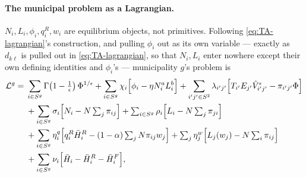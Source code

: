 \documentclass[12pt, a4paper]{article}
\theoremstyle{definition}
\theoremstyle{remark}
\begin{document}
\paragraph{The municipal problem as a Lagrangian.} $N_i,L_i,\phi_i,q_i^R,w_i$ are equilibrium objects, not primitives. Following \eqref{eq:TA-lagrangian}'s construction, and pulling $\phi_i$ out as its own variable — exactly as $d_{k\ell}$ is pulled out in \eqref{eq:TA-lagrangian}, so that $N_i,L_i$ enter nowhere except their own defining identities and $\phi_i$'s — municipality $g$'s problem is
\begin{align}
    \label{eq:muni-lagrangian}
\mathcal L^g = {}& \sum_{i\in S^g} \Gamma\!\left(1-\tfrac1\epsilon\right)\Phi^{1/\epsilon}
+ \sum_{i\in S^g}\chi_i\Bigl[\phi_i-\eta N_i^aL_i^b\Bigr]
+ \sum_{i'j'\in S^2}\lambda_{i'j'}\Bigl[T_{i'}E_{j'}\tilde V_{i'j'}^\epsilon - \pi_{i'j'}\Phi\Bigr] \nonumber\\
&+ \sum_{i\in S^g}\sigma_i\Bigl[N_i - N\textstyle\sum_j\pi_{ij}\Bigr]
+ \sum_{i\in S^g}\rho_i\Bigl[L_i - N\textstyle\sum_j\pi_{ji}\Bigr] \nonumber\\
&+ \sum_{i\in S^g}\eta_i^q\Bigl[q_i^R\bar H_i^R - (1-\alpha)\textstyle\sum_jN\pi_{ij}w_j\Bigr]
+ \sum_j\eta_j^w\Bigl[L_j(w_j) - N\textstyle\sum_i\pi_{ij}\Bigr] \nonumber\\
&+ \sum_{i\in S^g}\nu_i\Bigl[\bar H_i-\bar H_i^R-\bar H_i^F\Bigr],
\end{align}
\end{document}
